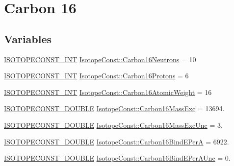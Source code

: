 \hypertarget{group___isotope_const-_carbon-_c16}{}\section{Carbon 16}
\label{group___isotope_const-_carbon-_c16}
\subsection*{Variables}
\begin{DoxyCompactItemize}
\item 
\mbox{\hyperlink{group___isotope_const-_macros_ga5f18360b3e99483a35c32d789e62621c}{I\+S\+O\+T\+O\+P\+E\+C\+O\+N\+S\+T\+\_\+\+I\+NT}} \mbox{\hyperlink{group___isotope_const-_carbon-_c16_gab70a361bd5370223b030ea5d910d752e}{Isotope\+Const\+::\+Carbon16\+Neutrons}} = 10
\item 
\mbox{\hyperlink{group___isotope_const-_macros_ga5f18360b3e99483a35c32d789e62621c}{I\+S\+O\+T\+O\+P\+E\+C\+O\+N\+S\+T\+\_\+\+I\+NT}} \mbox{\hyperlink{group___isotope_const-_carbon-_c16_ga1611f731be98d5c434c61a41bc61e7d7}{Isotope\+Const\+::\+Carbon16\+Protons}} = 6
\item 
\mbox{\hyperlink{group___isotope_const-_macros_ga5f18360b3e99483a35c32d789e62621c}{I\+S\+O\+T\+O\+P\+E\+C\+O\+N\+S\+T\+\_\+\+I\+NT}} \mbox{\hyperlink{group___isotope_const-_carbon-_c16_ga00ceb495d2b19c56786429026aa38787}{Isotope\+Const\+::\+Carbon16\+Atomic\+Weight}} = 16
\item 
\mbox{\hyperlink{group___isotope_const-_macros_ga8f45a7272ce02c0b4c65c44636ed719a}{I\+S\+O\+T\+O\+P\+E\+C\+O\+N\+S\+T\+\_\+\+D\+O\+U\+B\+LE}} \mbox{\hyperlink{group___isotope_const-_carbon-_c16_ga34bdc0162715b4204eb5388a7350e3d4}{Isotope\+Const\+::\+Carbon16\+Mass\+Exc}} = 13694.
\item 
\mbox{\hyperlink{group___isotope_const-_macros_ga8f45a7272ce02c0b4c65c44636ed719a}{I\+S\+O\+T\+O\+P\+E\+C\+O\+N\+S\+T\+\_\+\+D\+O\+U\+B\+LE}} \mbox{\hyperlink{group___isotope_const-_carbon-_c16_ga5ba41785e7573226be0d2f5a85f150f6}{Isotope\+Const\+::\+Carbon16\+Mass\+Exc\+Unc}} = 3.
\item 
\mbox{\hyperlink{group___isotope_const-_macros_ga8f45a7272ce02c0b4c65c44636ed719a}{I\+S\+O\+T\+O\+P\+E\+C\+O\+N\+S\+T\+\_\+\+D\+O\+U\+B\+LE}} \mbox{\hyperlink{group___isotope_const-_carbon-_c16_ga607339587ce2fc4cad6e1012ddf254e6}{Isotope\+Const\+::\+Carbon16\+Bind\+E\+PerA}} = 6922.
\item 
\mbox{\hyperlink{group___isotope_const-_macros_ga8f45a7272ce02c0b4c65c44636ed719a}{I\+S\+O\+T\+O\+P\+E\+C\+O\+N\+S\+T\+\_\+\+D\+O\+U\+B\+LE}} \mbox{\hyperlink{group___isotope_const-_carbon-_c16_ga8cff1a326986b99c15255c9a28d3b96a}{Isotope\+Const\+::\+Carbon16\+Bind\+E\+Per\+A\+Unc}} = 0.

\end{DoxyCompactItemize}
